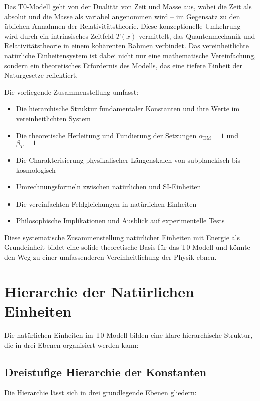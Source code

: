 \documentclass[12pt,a4paper]{article}
\newcommand{\Tfield}{T(x)}
\begin{document}
	Das T0-Modell geht von der Dualität von Zeit und Masse aus, wobei die Zeit als absolut und die Masse als variabel angenommen wird – im Gegensatz zu den üblichen Annahmen der Relativitätstheorie. Diese konzeptionelle Umkehrung wird durch ein intrinsisches Zeitfeld $\Tfield$ vermittelt, das Quantenmechanik und Relativitätstheorie in einem kohärenten Rahmen verbindet. Das vereinheitlichte natürliche Einheitensystem ist dabei nicht nur eine mathematische Vereinfachung, sondern ein theoretisches Erfordernis des Modells, das eine tiefere Einheit der Naturgesetze reflektiert.
	
	Die vorliegende Zusammenstellung umfasst:
	\begin{itemize}
		\item Die hierarchische Struktur fundamentaler Konstanten und ihre Werte im vereinheitlichten System
		\item Die theoretische Herleitung und Fundierung der Setzungen $\alpha_{\text{EM}} = 1$ und $\beta_T = 1$
		\item Die Charakterisierung physikalischer Längenskalen von subplanckisch bis kosmologisch
		\item Umrechnungsformeln zwischen natürlichen und SI-Einheiten
		\item Die vereinfachten Feldgleichungen in natürlichen Einheiten
		\item Philosophische Implikationen und Ausblick auf experimentelle Tests
	\end{itemize}
	
	Diese systematische Zusammenstellung natürlicher Einheiten mit Energie als Grundeinheit bildet eine solide theoretische Basis für das T0-Modell und könnte den Weg zu einer umfassenderen Vereinheitlichung der Physik ebnen.
	
	\section{Hierarchie der Natürlichen Einheiten}
	
	Die natürlichen Einheiten im T0-Modell bilden eine klare hierarchische Struktur, die in drei Ebenen organisiert werden kann:
	
	\subsection{Dreistufige Hierarchie der Konstanten}
	
	Die Hierarchie lässt sich in drei grundlegende Ebenen gliedern:
	
\end{document}
